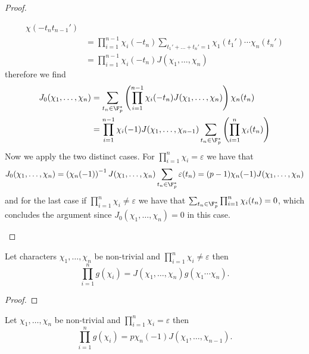 \begin{proof}
\begin{enumerate}[i.]
\begin{align*}
                  \chi(-t_nt_{n-1}')                                                   \\
                   & = \prod_{i = 1}^{n-1} \chi_i(-t_n) \sum_{t_1' + \dots + t_n' = 1}
                  \chi_1(t_1') \cdots \chi_n(t_n')                                     \\
                   & = \prod_{i=1}^{n-1} \chi_i(-t_n) J(\chi_1, \dots, \chi_n)
              \end{align*}
              therefore we find
              \begin{align*}
                  J_0(\chi_1, \dots, \chi_n)
                   & = \sum_{t_n \in \F_p^{\ast}} \left( \prod_{i=1}^{n-1} \chi_i(-t_n)
                  J(\chi_1,\dots, \chi_n)\right) \chi_n(t_n)                             \\
                   & = \prod_{i=1}^{n-1} \chi_i(-1) J(\chi_1,\dots,\chi_{n-1}) \sum_{t_n
                      \in \F_p^\ast}\left( \prod_{i=1}^{n} \chi_i(t_n) \right)
              \end{align*}
              Now we apply the two distinct cases. For \(\prod_{i=1}^{n} \chi_i =
              \varepsilon\) we have that
              \[
                  J_0(\chi_1,\dots,\chi_n) = \left( \chi_n(-1) \right)^{-1} J(\chi_1,
                  \dots, \chi_n) \sum_{t_n \in \F_p^\ast} \varepsilon(t_n) = (p-1)
                  \chi_n(-1) J(\chi_1,\dots,\chi_n)
              \]
              and for the last case if \(\prod_{i = 1}^n \chi_i \neq  \varepsilon\)
              we have that \(\sum_{t_n \in \F_p^\ast} \prod_{i=1}^n \chi_i(t_n) =
              0\), which concludes the argument since \(J_0(\chi_1, \dots, \chi_n)=
              0\) in this case.
    \end{enumerate}
\end{proof}

\begin{theorem}
    Let characters \(\chi_1, \dots, \chi_n\) be non-trivial and  \(\prod_{i =
        1}^{n} \chi_i \neq  \varepsilon\) then
    \[
        \prod_{i=1}^{n} g(\chi_i) = J(\chi_1, \dots, \chi_n) g(\chi_1 \cdots
        \chi_n).
    \]
\end{theorem}

\begin{proof}
\end{proof}

\begin{corollary}
    Let \(\chi_1,\dots,\chi_n\) be non-trivial and \(\prod_{i=1}^n \chi_i =
    \varepsilon\) then
    \[
        \prod_{i=1}^n g(\chi_i) = p\chi_n(-1) J(\chi_1,\dots,\chi_{n-1}).
    \]
\end{corollary}

